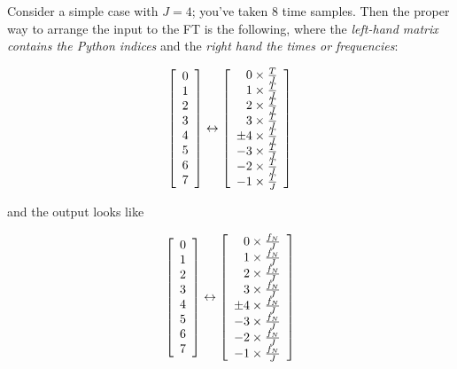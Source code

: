 \documentclass[11pt,preprint]{aastex}
\begin{document}
          Consider a simple case with $J=4$; you've taken 8 time
samples.  Then the proper way to arrange the input to the FT is the
following, where the {\it left-hand matrix contains the Python indices} and
the {\it right hand the times or frequencies}:

\begin{mathletters} \label{eqeg}
\begin{eqnarray} 
\left[
\begin{array}{r} 
0 \\ 1 \\ 2 \\ 3 \\ 4 \\ 5 \\ 6 \\ 7 
\end{array} \right] \leftrightarrow
\left[
\begin{array}{r} 
0 \times {T \over J} \\
1 \times {T \over J} \\
2 \times {T \over J} \\
3 \times {T \over J} \\
\pm 4 \times {T \over J} \\
-3 \times {T \over J} \\
-2 \times {T \over J} \\
-1 \times {T \over J} \\
\end{array} \right] 
\end{eqnarray}

\noindent and the output looks like

\begin{eqnarray} 
\left[
\begin{array}{r} 
0 \\ 1 \\ 2 \\ 3 \\ 4 \\ 5 \\ 6 \\ 7
\end{array} \right] \leftrightarrow
\left[
\begin{array}{r} 
0 \times {f_N \over J} \\
1 \times {f_N \over J} \\
2 \times {f_N \over J} \\
3 \times {f_N \over J} \\
\pm 4 \times {f_N \over J} \\
-3 \times {f_N \over J} \\
-2 \times {f_N \over J} \\
-1 \times {f_N \over J} \\
\end{array} \right] 
\end{eqnarray}
\end{mathletters}
\end{document}
